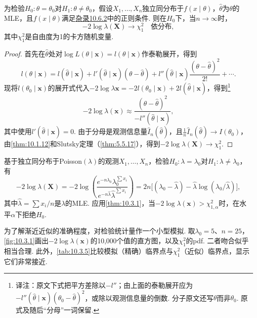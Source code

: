 \begin{theorem}[LRT的渐近分布：简单$H_0$]\label{thm:10.3.1}
为检验$H_0:\theta=\theta_0$对$H_1:\theta\ne\theta_0$，假设$X_1,\ldots,X_n$独立同分布于$f(x\mid\theta)$，$\hat\theta$为$\theta$的MLE，且$f(x\mid\theta)$满足\hyperref[sec:10.6.2]{杂录10.6.2}中的正则条件. 则在$H_0$下，当$n\to\infty$时，
$$-2\log\lambda(\boldsymbol X)\longrightarrow\chi_1^2\quad\text{依分布},$$
其中$\chi_1^2$是自由度为1的卡方随机变量.
\end{theorem}
\begin{proof}
首先在$\hat\theta$处对$\log L(\theta\mid\boldsymbol x)=l(\theta\mid\boldsymbol x)$作泰勒展开，得到
$$l(\theta\mid\boldsymbol x)=l(\hat\theta\mid\boldsymbol x)+l'(\hat\theta\mid\boldsymbol x)(\theta-\hat\theta)+l''(\hat\theta\mid\boldsymbol x)\frac{(\theta-\hat\theta)^2}{2!}+\cdots.$$
现将$l(\theta_0\mid\boldsymbol x)$的展开式代入$-2\log\lambda\boldsymbol x=-2l(\theta_0\mid\boldsymbol x)+2l(\hat\theta\mid\boldsymbol x)$，得到\footnote{译注：原文下式把平方差除以$-l''$；由上面的泰勒展开应为$-l''(\hat\theta\mid\boldsymbol x)(\theta_0-\hat\theta)^2$，或除以观测信息量的倒数. 分子原文还写$\theta$而非$\theta_0$. 原式及随后“分母”一词保留.}
$$-2\log\lambda(\boldsymbol x)\approx\frac{(\theta-\hat\theta)^2}{-l''(\hat\theta\mid\boldsymbol x)},$$
其中使用$l'(\hat\theta\mid\boldsymbol x)=0$. 由于分母是观测信息量$\hat I_n(\hat\theta)$，且$\frac1n\hat I_n(\hat\theta)\to I(\theta_0)$，由\autoref{thm:10.1.12}和Slutsky定理（\autoref{thm:5.5.17}），得到$-2\log\lambda(\boldsymbol X)\to\chi_1^2$.
\end{proof}

\begin{example}[泊松LRT]\label{ex:10.3.2}
基于独立同分布于Poisson$(\lambda)$的观测$X_1,\ldots,X_n$，检验$H_0:\lambda=\lambda_0$对$H_1:\lambda\ne\lambda_0$，有
$$-2\log\lambda(\boldsymbol X)=-2\log\left(\frac{e^{-n\lambda_0}\lambda_0^{\sum x_i}}{e^{-n\hat\lambda}\hat\lambda^{\sum x_i}}\right)
=2n\bigl[(\lambda_0-\hat\lambda)-\hat\lambda\log(\lambda_0/\hat\lambda)\bigr],$$
其中$\hat\lambda=\sum x_i/n$是$\lambda$的MLE. 应用\autoref{thm:10.3.1}，当$-2\log\lambda(\boldsymbol x)>\chi_{1,\alpha}^2$时，在水平$\alpha$下拒绝$H_0$.

为了解渐近近似的准确程度，对检验统计量作一个小型模拟. 取$\lambda_0=5$、$n=25$，\autoref{fig:10.3.1}画出$-2\log\lambda(\boldsymbol x)$的10,000个值的直方图，以及$\chi_1^2$的pdf. 二者吻合似乎相当合理. 此外，\autoref{tab:10.3.5}比较模拟（精确）临界点与$\chi_1^2$（近似）临界点，显示它们非常接近.
\end{example}

